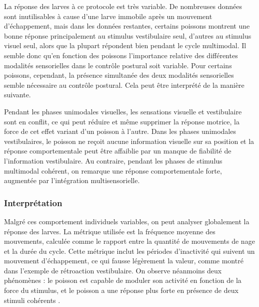 La réponse des larves à ce protocole est très variable. De nombreuses données sont inutilisables à cause d'une larve immobile après un mouvement d'échappement, mais dans les données restantes, certains poissons montrent une bonne réponse principalement au stimulus vestibulaire seul, d'autres au stimulus visuel seul, alors que la plupart répondent bien pendant le cycle multimodal. Il semble donc qu'en fonction des poissons l'importance relative des différentes modalités sensorielles dans le contrôle postural soit variable. Pour certains poissons, cependant, la présence simultanée des deux modalités sensorielles semble nécessaire au contrôle postural. Cela peut être interprété de la manière suivante.

Pendant les phases unimodales visuelles, les sensations visuelle et vestibulaire sont en conflit, ce qui peut réduire et même supprimer la réponse motrice, la force de cet effet variant d'un poisson à l'autre. Dans les phases unimodales vestibulaires, le poisson ne reçoit aucune information visuelle sur sa position et la réponse comportementale peut être affaiblie par un manque de fiabilité de l'information vestibulaire. Au contraire, pendant les phases de stimulus multimodal cohérent, on remarque une réponse comportementale forte, augmentée par l'intégration multisensorielle.


\subsubsection{Interprétation}
Malgré ces comportement individuels variables, on peut analyser globalement la réponse des larves. La métrique utilisée est la fréquence moyenne des mouvements, calculée comme le rapport entre la quantité de mouvements de nage et la durée du cycle. Cette métrique inclut les périodes d'inactivité qui suivent un mouvement d'échappement, ce qui fausse légèrement la valeur, comme montré dans l'exemple de rétroaction vestibulaire. On observe néanmoins deux phénomènes : le poisson est capable de moduler son activité en fonction de la force du stimulus, et le poisson a une réponse plus forte en présence de deux stimuli cohérents .

